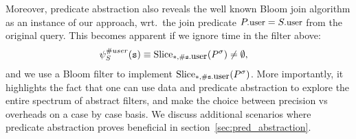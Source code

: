 Moreover, predicate abstraction also reveals the well known Bloom
join algorithm as an instance of our approach, wrt.\ the join
predicate $\facc{P}{user} = \facc{S}{user}$ from the original query. 
This becomes apparent if we ignore time in the filter above:
\begin{align*}
&
\PrecedesPPP^{\hashid{user}}(\symv{s}) \equiv 
\slice{\syms{P}}{*, \hashid{\facc{\symv{s}}{user}}}
\neq \emptyset,
\end{align*}
and we use a Bloom filter to implement 
$\slice{\syms{P}}{*, \hashid{\facc{\symv{s}}{user}}}$.
More importantly, it highlights the fact that one can use data and predicate 
abstraction to explore the entire spectrum of abstract filters, and make the 
choice between precision vs overheads on a case by case basis.
We discuss additional scenarios where predicate abstraction proves
beneficial in section~\ref{sec:pred_abstraction}.


